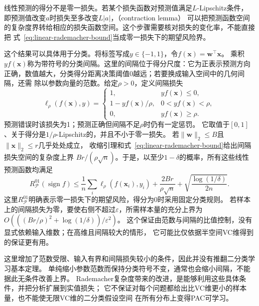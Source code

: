 线性预测的得分不是零一损失。若某个损失函数对预测值满足$L$-Lipschitz条件，
即预测值改变$a$时损失至多改变$L|a|$，（contraction lemma）
可以把预测函数空间的复杂度界转给相应的损失函数空间。这个步骤需要核对损失的变化率，不能直接把
式~\eqref{eq:linear-rademacher-bound}当成零一损失下的期望风险界。

这个结果可以具体用于分类。将标签写成$y\in\{-1,1\}$，令$f(\bm x)=\bm w^\top\bm x$。
乘积$yf(\bm x)$称为带符号的分类间隔。这里的间隔位于得分尺度：它为正表示预测方向
正确，数值越大，分类得分距离决策阈值0越远；若要换成输入空间中的几何间隔，还需
除以参数向量的范数。给定$\rho>0$，定义间隔损失
\[
 \ell_\rho(f(\bm x),y)=
 \begin{cases}
  1,&yf(\bm x)\leq0,\\
  1-yf(\bm x)/\rho,&0<yf(\bm x)<\rho,\\
  0,&yf(\bm x)\geq\rho.
 \end{cases}
\]
预测错误时该损失为1；预测正确但间隔不足$\rho$时仍有一定惩罚。
它取值于$[0,1]$、关于得分是$1/\rho$-Lipschitz的，并且不小于零一损失。
若$\|\bm w\|_2\leq B$且$\|\bm x\|_2\leq r$几乎处处成立，
收缩引理和式~\eqref{eq:linear-rademacher-bound}给出间隔损失空间的复杂度上界
$Br/(\rho\sqrt n)$。于是，以至少$1-\delta$的概率，所有这些线性预测函数均满足
\begin{equation}
 R_{\mathcal P}^{01}(\operatorname{sign}f)
 \leq\frac1n\sum_i\ell_\rho(f(\bm x_i),y_i)
 +\frac{2Br}{\rho\sqrt n}
 +\sqrt{\frac{\log(1/\delta)}{2n}}.
 \label{eq:rademacher-margin-risk}
\end{equation}
这里$R_{\mathcal P}^{01}$明确表示零一损失下的期望风险，得分为0时采用固定分类规则。
若样本上的间隔损失为零，要使右侧不超过$\varepsilon$，所需样本量的充分上界为
$O(((Br/\rho)^2+\log(1/\delta))/\varepsilon^2)$。
这个保证由范数与间隔的比值控制，没有显式依赖输入维数；在高维且间隔较大的情形，
它可能比仅依据半空间VC维得到的保证更有用。

这里增加了范数受限、输入有界和间隔损失较小的条件，因此并没有推翻二分类学习基本定理。
单纯缩小参数范数而保持分类符号不变，通常也会缩小间隔，不能据此无条件改善上界。
Rademacher复杂度带来的改进，是能够利用这些具体条件，并把分析扩展到实值损失；
它不保证对每个问题都给出比VC维更小的样本量，也不能使无限VC维的二分类假设空间
在所有分布上变得PAC可学习。


